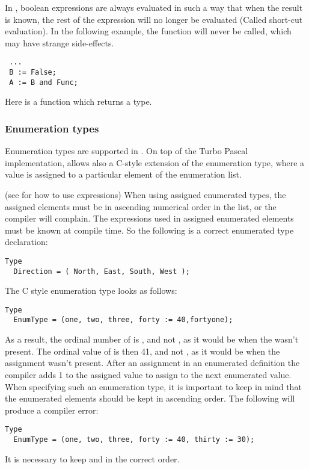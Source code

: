 \begin{remark}
In \fpc, boolean expressions are always evaluated in such a
way that when the result is known, the rest of the expression will no longer
be evaluated (Called short-cut evaluation). In the following example, the function  will never
be called, which may have strange side-effects.
\begin{verbatim}
 ...
 B := False;
 A := B and Func;
\end{verbatim}
Here  is a function which returns a  type.
\end{remark}

\subsubsection{Enumeration types}
Enumeration types are supported in \fpc. On top of the Turbo Pascal
implementation, \fpc allows also a C-style extension of the
enumeration type, where a value is assigned to a particular element of
the enumeration list.

(see  for how to use expressions)
When using assigned enumerated types, the assigned elements must be in
ascending numerical order in the list, or the compiler will complain.
The expressions used in assigned enumerated elements must be known at
compile time.
So the following is a correct enumerated type declaration:
\begin{verbatim}
Type
  Direction = ( North, East, South, West );
\end{verbatim}
The C style enumeration type looks as follows:
\begin{verbatim}
Type
  EnumType = (one, two, three, forty := 40,fortyone);
\end{verbatim}
As a result, the ordinal number of  is , and not ,
as it would be when the  wasn't present.
The ordinal value of  is then {41}, and not , as it
would be when the assignment wasn't present. After an assignment in an
enumerated definition the compiler adds 1 to the assigned value to assign to
the next enumerated value.
When specifying such an enumeration type, it is important to keep in mind
that the enumerated elements should be kept in ascending order. The
following will produce a compiler error:
\begin{verbatim}
Type
  EnumType = (one, two, three, forty := 40, thirty := 30);
\end{verbatim}
It is necessary to keep  and  in the correct order.

